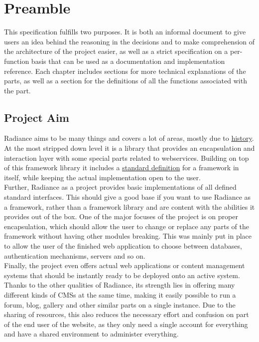 \chapter{Preamble}\label{sec:preamble}
This specification fulfills two purposes. It is both an informal document to give users an idea behind the reasoning in the decisions and to make comprehension of the architecture of the project easier, as well as a strict specification on a per-function basis that can be used as a documentation and implementation reference. Each chapter includes sections for more technical explanations of the parts, as well as a section for the definitions of all the functions associated with the part.

\section{Project Aim}\label{sec:project aim}
Radiance aims to be many things and covers a lot of areas, mostly due to \hyperref[sec:history]{history}. At the most stripped down level it is a library that provides an encapsulation and interaction layer with some special parts related to webservices. Building on top of this framework library it includes a \hyperref[sec:standard interfaces]{standard definition} for a framework in itself, while keeping the actual implementation open to the user. \\

Further, Radiance as a project provides basic implementations of all defined standard interfaces. This should give a good base if you want to use Radiance as a framework, rather than a framework library and are content with the abilities it provides out of the box. One of the major focuses of the project is on proper encapsulation, which should allow the user to change or replace any parts of the framework without having other modules breaking. This was mainly put in place to allow the user of the finished web application to choose between databases, authentication mechanisms, servers and so on. \\

Finally, the project even offers actual web applications or content management systems that should be instantly ready to be deployed onto an active system. Thanks to the other qualities of Radiance, its strength lies in offering many different kinds of CMSs at the same time, making it easily possible to run a forum, blog, gallery and other similar parts on a single instance. Due to the sharing of resources, this also reduces the necessary effort and confusion on part of the end user of the website, as they only need a single account for everything and have a shared environment to administer everything. \\

